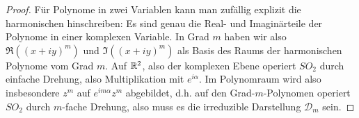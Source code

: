\begin{proof}
Für Polynome in zwei Variablen kann man zufällig explizit die harmonischen hinschreiben: Es sind genau die Real- und Imaginärteile der Polynome in einer komplexen Variable. In Grad $m$ haben wir also $\Re((x+iy)^m)$ und $\Im((x+iy)^m)$ als Basis des Raums der harmonischen Polynome vom Grad $m$. Auf $\mathbb{R}^2$, also der komplexen Ebene operiert $SO_2$ durch einfache Drehung, also Multiplikation mit $e^{i\alpha}$. Im Polynomraum wird also insbesondere $z^m$ auf $e^{im\alpha}z^m$ abgebildet, d.h. auf den Grad-$m$-Polynomen operiert $SO_2$ durch $m$-fache Drehung, also muss es die irreduzible Darstellung $\mathcal{D}_m$ sein.
\end{proof}